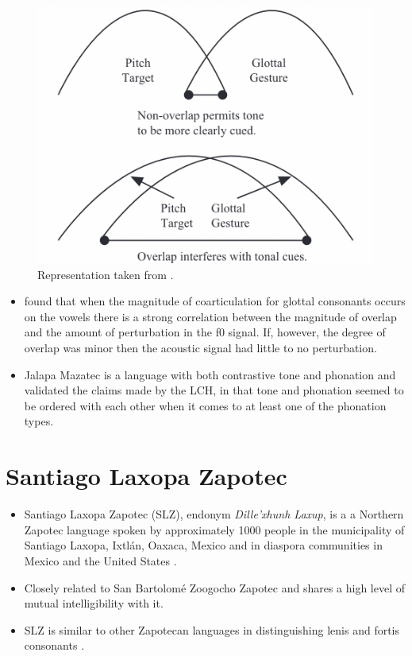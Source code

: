 \documentclass[12pt, letterpaper]{article}
\begin{document}
	\begin{figure}[!ht]
		\centering
		\includegraphics[width=.5\textwidth]{../Gestures.png}
		\caption{Representation taken from \citet{dicanioCoarticulationToneGlottal2012}.}
		\label{fig:GlottalGestures}
	\end{figure}
\begin{itemize}
	\item \citet{dicanioCoarticulationToneGlottal2012} found that when the magnitude of coarticulation for glottal consonants occurs on the vowels there is a strong correlation between the magnitude of overlap and the amount of perturbation in the f0 signal. If, however, the degree of overlap was minor then the acoustic signal had little to no perturbation.
	\item Jalapa Mazatec is a language with both contrastive tone and phonation and \citet{garellekAcousticConsequencesPhonation2011} validated the claims made by the LCH, in that tone and phonation seemed to be ordered with each other when it comes to at least one of the phonation types.
\end{itemize}

\section{Santiago Laxopa Zapotec} \label{sec:SLZ}

\begin{itemize}
    \item Santiago Laxopa Zapotec (SLZ), endonym \textit{Dille'xhunh Laxup}, is a a Northern Zapotec language spoken by approximately 1000 people in the municipality of Santiago Laxopa, Ixtlán, Oaxaca, Mexico and in diaspora communities in Mexico and the United States \citep{adlerAcousticsPhonationTypes2016,adlerDerivationVerbInitiality2018,foleyForbiddenCliticClusters2018,foleyExtendingPersonCaseConstraint2020}.
    \item Closely related to San Bartolomé Zoogocho Zapotec \citep{longDiccionarioZapotecoSan2005,sonnenscheinDescriptiveGrammarSan2005} and shares a high level of mutual intelligibility with it.
    \item SLZ is similar to other Zapotecan languages in distinguishing lenis and fortis consonants \citep[e.g.,][]{nellisFortisLenisCajonos1980,jaegerFortisLenisQuestion1983,uchiharaFortisLenisGlides2016}.
\end{itemize}
\end{document}
